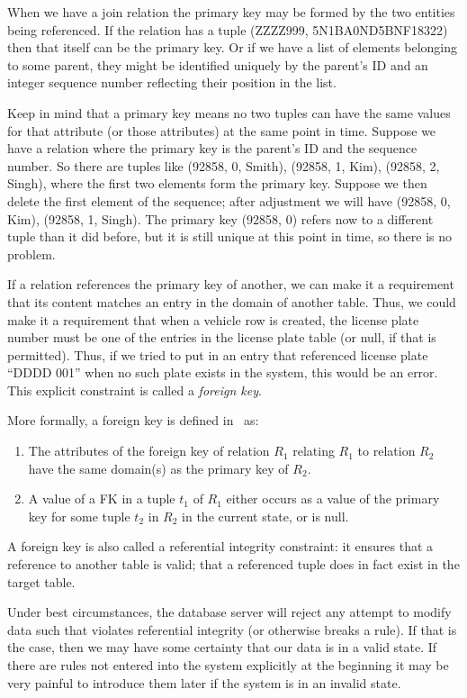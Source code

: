 When we have a join relation the primary key may be formed by the two entities being referenced. If the relation has a tuple (ZZZZ999, 5N1BA0ND5BNF18322) then that itself can be the primary key. Or if we have a list of elements belonging to some parent, they might be identified uniquely by the parent's ID and an integer sequence number reflecting their position in the list. 

Keep in mind that a primary key means no two tuples can have the same values for that attribute (or those attributes) at the same point in time. Suppose we have a relation where the primary key is the parent's ID and the sequence number. So there are tuples like (92858, 0, Smith), (92858, 1, Kim), (92858, 2, Singh), where the first two elements form the primary key. Suppose we then delete the first element of the sequence; after adjustment we will have (92858, 0, Kim), (92858, 1, Singh). The primary key (92858, 0) refers now to a different tuple than it did before, but it is still unique at this point in time, so there is no problem.

If a relation references the primary key of another, we can make it a requirement that its content matches an entry in the domain of another table. Thus, we could make it a requirement that when a vehicle row is created, the license plate number must be one of the entries in the license plate table (or null, if that is permitted). Thus, if we tried to put in an entry that referenced license plate ``DDDD 001'' when no such plate exists in the system, this would be an error. This explicit constraint is called a \textit{foreign key}. 

More formally, a foreign key is defined in~\cite{fds} as:
\begin{enumerate}
\item The attributes of the foreign key of relation $R_{1}$ relating $R_{1}$ to relation $R_{2}$ have the same domain(s) as the primary key of $R_{2}$.
\item A value of a FK in a tuple $t_{1}$ of $R_{1}$ either occurs as a value of the primary key for some tuple $t_{2}$ in $R_{2}$ in the current state, or is null. 
\end{enumerate}


A foreign key is also called a referential integrity constraint: it ensures that a reference to another table is valid; that a referenced tuple does in fact exist in the target table.

Under best circumstances, the database server will reject any attempt to modify data such that violates referential integrity (or otherwise breaks a rule). If that is the case, then we may have some certainty that our data is in a valid state. If there are rules not entered into the system explicitly at the beginning it may be very painful to introduce them later if the system is in an invalid state. 


